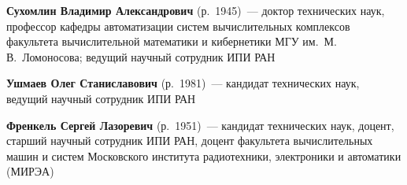 \begin{multicols}{2}
\noindent
\textbf{Сухомлин Владимир Александрович} (р.\ 1945)~--- доктор технических наук,
профессор кафедры автоматизации сис\-тем вычислительных комплексов\linebreak
факультета вычислительной
математики и кибернетики МГУ им.\ М.\,В.~Ломоносова;
ведущий научный сотрудник ИПИ РАН


\vspace*{9pt}





\noindent
\textbf{Ушмаев Олег Станиславович} (р.\ 1981)~---  кандидат
технических наук, ведущий научный сотрудник ИПИ РАН

\vspace*{9pt}



\noindent
\textbf{Френкель Сергей Лазоревич} (р.\ 1951)~---  кандидат\linebreak
технических наук, 
доцент, старший научный сотрудник ИПИ РАН, доцент факультета 
вы\-чис\-ли\-тель\-ных машин и систем Московского института радиотехники,
электроники и автоматики (\mbox{МИРЭА})%
\end{multicols}